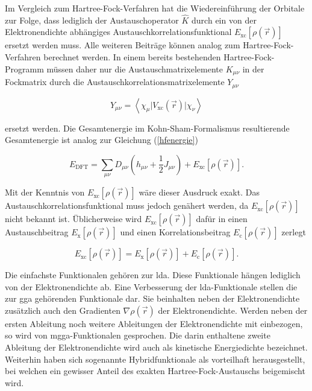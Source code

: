 Im Vergleich zum Hartree-Fock-Verfahren hat die Wiedereinführung der Orbitale zur Folge, dass lediglich der Austauschoperator $\hat{K}$ durch ein von der Elektronendichte abhängiges Austauschkorrelationsfunktional $E_{\textrm{xc}}[\rho(\vec{r})]$ ersetzt werden muss. Alle weiteren Beiträge können analog zum Hartree-Fock-Verfahren berechnet werden. In einem bereits bestehenden Hartree-Fock-Programm müssen daher nur die Austauschmatrixelemente $K_{\mu\nu}$ in der Fockmatrix durch die Austauschkorrelationsmatrixelemente $Y_{\mu\nu}$ 

\begin{equation}
Y_{\mu\nu}=\left\langle\chi_\mu\vert V_{\textrm{xc}}(\vec{r})\vert\chi_\nu\right\rangle
\end{equation}

ersetzt werden. Die Gesamtenergie im Kohn-Sham-Formalismus resultierende Gesamtenergie ist analog zur Gleichung (\ref{hfenergie})

\begin{equation}
E_{\textrm{DFT}}=\sum_{\mu\nu}D_{\mu\nu}(h_{\mu\nu}+\frac{1}{2}J_{\mu\nu})+E_{\textrm{xc}}[\rho(\vec{r})].
\label{dftenergie}
\end{equation}

Mit der Kenntnis von $E_{\textrm{xc}}[\rho(\vec{r})]$ wäre dieser Ausdruck exakt. Das Austauschkorrelationsfunktional muss jedoch genähert werden, da $E_{\textrm{xc}}[\rho(\vec{r})]$ nicht bekannt ist. Üblicherweise wird $E_{\textrm{xc}}[\rho(\vec{r})]$ dafür in einen Austauschbeitrag $E_{\textrm{x}}[\rho(\vec{r})]$ und einen Korrelationsbeitrag $E_{\textrm{c}}[\rho(\vec{r})]$ zerlegt

\begin{equation}
E_{\textrm{xc}}[\rho(\vec{r})] = E_{\textrm{x}}[\rho(\vec{r})] + E_{\textrm{c}}[\rho(\vec{r})].
\end{equation}

Die einfachste Funktionalen gehören zur \ac{lda}. Diese Funktionale hängen lediglich von der Elektronendichte ab. Eine Verbesserung der \ac{lda}-Funktionale stellen die zur \ac{gga} gehörenden Funktionale dar. Sie beinhalten neben der Elektronendichte zusätzlich auch den Gradienten $\nabla\rho(\vec{r})$ der Elektronendichte. Werden neben der ersten Ableitung noch weitere Ableitungen der Elektronendichte mit einbezogen, so wird von \ac{mgga}-Funktionalen gesprochen. Die darin enthaltene zweite Ableitung der Elektronendichte wird auch als kinetische Energiedichte bezeichnet. Weiterhin haben sich sogenannte Hybridfunktionale als vorteilhaft herausgestellt, bei welchen ein gewisser Anteil des exakten Hartree-Fock-Austauschs beigemischt wird.


